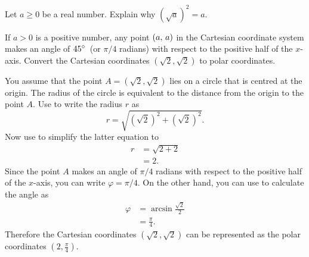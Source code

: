 \documentclass[a4paper,oneside,12pt]{article}
\begin{document}
\begin{exercise}
\label{ex:square_root_of_a_squared}
Let $a \geq 0$ be a real number.  Explain why $(\sqrt{a})^2 = a$.
\end{exercise}


\begin{example}
If $a > 0$ is a positive number, any point $\left\lparen{a},\, {a}\right\rparen$ in the
Cartesian coordinate system makes an angle of
${45}^{\circ}$~(or $\pi / 4$ radians) with respect to the positive half
of the $x$-axis.  Convert the Cartesian coordinates
$(\sqrt{2}\comma \sqrt{2})$ to polar coordinates.
\end{example}

\begin{solution}
You assume that the point $A = (\sqrt{2}\comma \sqrt{2})$ lies on a
circle that is centred at the origin.  The radius of the circle is
equivalent to the distance from the origin to the point $A$.  Use
 to write the
radius $r$ as
\[
r
=
\sqrt{
  (\sqrt{2})^2 + (\sqrt{2})^2
}.
\]
Now use  to simplify the latter
equation to
\begin{align*}
r
&=
\sqrt{2 + 2} \\[4pt]
&=
2.
\end{align*}
Since the point $A$ makes an angle of $\pi / 4$ radians with respect
to the positive half of the $x$-axis, you can write
$\varphi = \pi / 4$.  On the other hand, you can use
 to calculate the
angle as
\begin{align*}
\varphi
&=
\arcsin\frac{\sqrt{2}}{2} \\[4pt]
&=
\frac{\pi}{4}.
\end{align*}
Therefore the Cartesian coordinates $(\sqrt{2}\comma \sqrt{2})$ can be
represented as the polar coordinates $(2\comma \frac{\pi}{4})$.
\end{solution}
\end{document}
